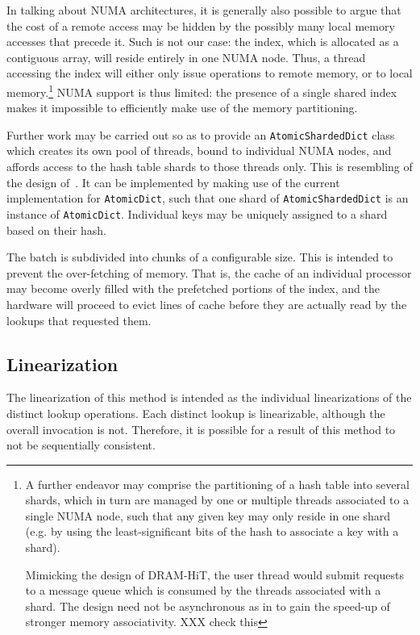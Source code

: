 In talking about NUMA architectures, it is generally also possible to argue that the cost of a remote access may be hidden by the possibly many local memory accesses that precede it.
Such is not our case: the index, which is allocated as a contiguous array, will reside entirely in one NUMA node.
Thus, a thread accessing the index will either only issue operations to remote memory, or to local memory.\footnote{%
	A further endeavor may comprise the partitioning of a hash table into several shards, which in turn are managed by one or multiple threads associated to a single NUMA node, such that any given key may only reside in one shard (e.g. by using the least-significant bits of the hash to associate a key with a shard).
	
	Mimicking the design of DRAM-HiT, the user thread would submit requests to a message queue which is consumed by the threads associated with a shard.
	The design need not be asynchronous as in \cite{dramhit} to gain the speed-up of stronger memory associativity. XXX check this
}
NUMA support is thus limited: the presence of a single shared index makes it impossible to efficiently make use of the memory partitioning.

Further work may be carried out so as to provide an \texttt{AtomicShardedDict} class which creates its own pool of threads, bound to individual NUMA nodes, and affords access to the hash table shards to those threads only.
This is resembling of the design of~\cite{dramhit}.
It can be implemented by making use of the current implementation for \texttt{AtomicDict}, such that one shard of \texttt{AtomicShardedDict} is an instance of \texttt{AtomicDict}.
Individual keys may be uniquely assigned to a shard based on their hash.

The batch is subdivided into chunks of a configurable size.
This is intended to prevent the over-fetching of memory.
That is, the cache of an individual processor may become overly filled with the prefetched portions of the index, and the hardware will proceed to evict lines of cache before they are actually read by the lookups that requested them.

\subsection{Linearization}\label{subsec:batch-lookup-linearization}

The linearization of this method is intended as the individual linearizations of the distinct lookup operations.
Each distinct lookup is linearizable, although the overall invocation is not.
Therefore, it is possible for a result of this method to not be sequentially consistent.


